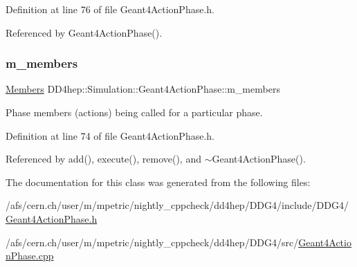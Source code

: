 Definition at line 76 of file Geant4\+Action\+Phase.\+h.



Referenced by Geant4\+Action\+Phase().

\hypertarget{class_d_d4hep_1_1_simulation_1_1_geant4_action_phase_a24b9ef3a3dbb361f17a5e2600dc6f57d}{}\label{class_d_d4hep_1_1_simulation_1_1_geant4_action_phase_a24b9ef3a3dbb361f17a5e2600dc6f57d} 
\subsubsection{\texorpdfstring{m\+\_\+members}{m\_members}}
{\footnotesize\ttfamily \hyperlink{class_d_d4hep_1_1_simulation_1_1_geant4_action_phase_a4df9a501a5c2d810603cd58f5ff5157d}{Members} D\+D4hep\+::\+Simulation\+::\+Geant4\+Action\+Phase\+::m\+\_\+members\hspace{0.3cm}{\ttfamily [protected]}}



Phase members (actions) being called for a particular phase. 



Definition at line 74 of file Geant4\+Action\+Phase.\+h.



Referenced by add(), execute(), remove(), and $\sim$\+Geant4\+Action\+Phase().



The documentation for this class was generated from the following files\+:\begin{DoxyCompactItemize}
\item 
/afs/cern.\+ch/user/m/mpetric/nightly\+\_\+cppcheck/dd4hep/\+D\+D\+G4/include/\+D\+D\+G4/\hyperlink{_geant4_action_phase_8h}{Geant4\+Action\+Phase.\+h}\item 
/afs/cern.\+ch/user/m/mpetric/nightly\+\_\+cppcheck/dd4hep/\+D\+D\+G4/src/\hyperlink{_geant4_action_phase_8cpp}{Geant4\+Action\+Phase.\+cpp}\end{DoxyCompactItemize}
